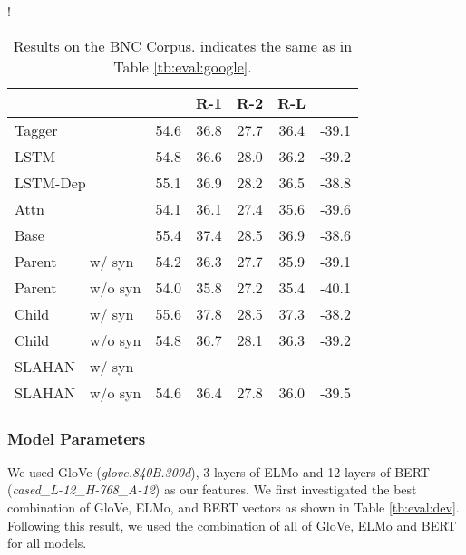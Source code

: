 \documentclass[letterpaper]{article} \usepackage{aaai20}  \usepackage{times}  \usepackage{helvet} \usepackage{courier}  \usepackage[hyphens]{url}  \usepackage{graphicx} \urlstyle{rm} \def\UrlFont{\rm}  \usepackage{graphicx}  \frenchspacing  \setlength{\pdfpagewidth}{8.5in}  \setlength{\pdfpageheight}{11in}  \usepackage{tabu}
\begin{document}
\begin{table}[t]
\centering
\small
\resizebox {0.825\columnwidth} {!} {
\begin{tabular}{llccccc}
\toprule
 & &  & \textbf{R-1} & \textbf{R-2} & \textbf{R-L} &  \\
\midrule
\multicolumn{2}{l}{Tagger}  & 54.6 & 36.8 & 27.7 & 36.4 & -39.1\\
\multicolumn{2}{l}{LSTM}    & 54.8 & 36.6 & 28.0 & 36.2 & -39.2\\
\multicolumn{2}{l}{LSTM-Dep}& 55.1 & 36.9 & 28.2 & 36.5 & -38.8\\
\multicolumn{2}{l}{Attn}    & 54.1 & 36.1 & 27.4 & 35.6 & -39.6\\
\multicolumn{2}{l}{Base}    & 55.4 & 37.4 & 28.5 & 36.9 & -38.6\\
Parent & w/ syn             & 54.2 & 36.3 & 27.7 & 35.9 & -39.1\\
Parent & w/o syn            & 54.0 & 35.8 & 27.2 & 35.4 & -40.1\\
\midrule
Child & w/ syn              & 55.6 & 37.8 & 28.5 & 37.3 & -38.2\\
Child & w/o syn             & 54.8 & 36.7 & 28.1 & 36.3 & -39.2\\
SLAHAN & w/ syn             &  &  &  &  & \\
SLAHAN & w/o syn            & 54.6 & 36.4 & 27.8 & 36.0 & -39.5\\
\bottomrule
\end{tabular}}
    \caption{Results on the BNC Corpus.  indicates the same as in Table \ref{tb:eval:google}.\label{tb:eval:bnc}}
\end{table}

\subsubsection{Model Parameters}

We used GloVe ({\sl glove.840B.300d}), 3-layers of ELMo and 12-layers of BERT ({\sl cased\_L-12\_H-768\_A-12}) as our features.
We first investigated the best combination of GloVe, ELMo, and BERT vectors as shown in Table \ref{tb:eval:dev}.
Following this result, we used the combination of all of GloVe, ELMo and BERT for all models.
\end{document}

